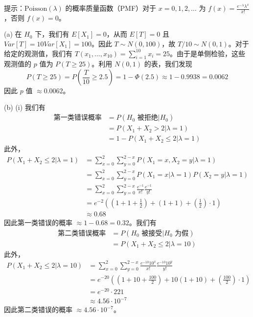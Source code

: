 \begin{questions}
提示：$\text{Poisson}(\lambda)$ 的概率质量函数（PMF）对于 $x = 0, 1, 2, \ldots$ 为 $f(x) = \frac{e^{-\lambda}\lambda^x}{x!}$，否则 $f(x) = 0$。

\begin{solution}
(a) 在 $H_0$ 下，我们有 $E[X_1] = 0$，从而 $E[T] = 0$ 且 $Var[T] = 10 Var[X_1] = 100$。因此 $T \sim N(0, 100)$，故 $T/10 \sim N(0, 1)$。对于给定的观测值，我们有 $T(x_1, \ldots, x_{10}) = \sum_{i=1}^{10} x_i = 25$。由于是单侧检验，这些观测值的 $p$ 值为 $P(T \ge 25)$。利用 $N(0, 1)$ 的表，我们发现
\[
P(T \ge 25) = P\left( \frac{T}{10} \ge 2.5 \right) = 1 - \Phi(2.5) \approx 1 - 0.9938 = 0.0062
\]
因此 $p$ 值 $\approx 0.0062$。

(b) (i) 我们有
\begin{align*}
\text{第一类错误概率} &= P(H_0 \text{ 被拒绝} | H_0) \\
&= P(X_1 + X_2 > 2 | \lambda = 1) \\
&= 1 - P(X_1 + X_2 \le 2 | \lambda = 1)
\end{align*}
此外，
\begin{align*}
P(X_1 + X_2 \le 2 | \lambda = 1) &= \sum_{x=0}^2 \sum_{y=0}^{2-x} P(X_1 = x, X_2 = y | \lambda = 1) \\
&= \sum_{x=0}^2 \sum_{y=0}^{2-x} P(X_1 = x | \lambda = 1) P(X_2 = y | \lambda = 1) \\
&= \sum_{x=0}^2 \sum_{y=0}^{2-x} \frac{e^{-1}}{x!} \frac{e^{-1}}{y!} \\
&= e^{-2} \left( \left( 1 + 1 + \frac{1}{2} \right) + (1 + 1) + \left( \frac{1}{2} \right) \cdot 1 \right) \\
&\approx 0.68
\end{align*}
因此第一类错误的概率 $\approx 1 - 0.68 = 0.32$。我们有
\begin{align*}
\text{第二类错误概率} &= P(H_0 \text{ 被接受} | H_0 \text{ 为假}) \\
&= P(X_1 + X_2 \le 2 | \lambda = 10)
\end{align*}
此外，
\begin{align*}
P(X_1 + X_2 \le 2 | \lambda = 10) &= \sum_{x=0}^2 \sum_{y=0}^{2-x} \frac{e^{-10} 10^x}{x!} \frac{e^{-10} 10^y}{y!} \\
&= e^{-20} \left( \left( 1 + 10 + \frac{100}{2} \right) + 10(1 + 10) + \left( \frac{100}{2} \right) \cdot 1 \right) \\
&= e^{-20} \cdot 221 \\
&\approx 4.56 \cdot 10^{-7}
\end{align*}
因此第二类错误的概率 $\approx 4.56 \cdot 10^{-7}$。


\end{solution}
\end{questions}
